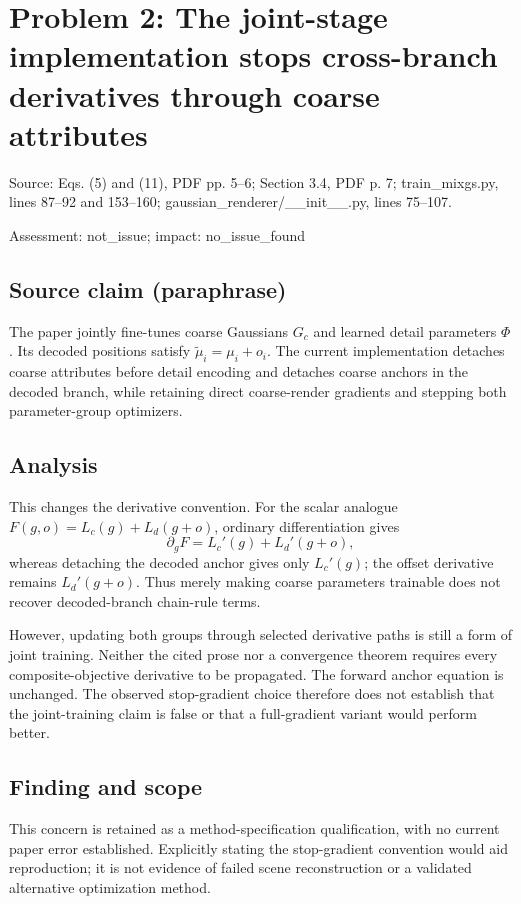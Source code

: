 \documentclass[11pt]{article}
\begin{document}
\section*{Problem 2: The joint-stage implementation stops cross-branch derivatives through coarse attributes}

Source: Eqs. (5) and (11), PDF pp. 5–6; Section 3.4, PDF p. 7; train\_mixgs.py, lines 87–92 and 153–160; gaussian\_renderer/\_\_init\_\_.py, lines 75–107.

Assessment: not\_issue; impact: no\_issue\_found

\subsection*{Source claim (paraphrase)}

The paper jointly fine-tunes coarse Gaussians \(G_c\) and learned detail parameters \(\Phi\). Its decoded positions satisfy \(\widetilde\mu_i=\mu_i+o_i\). The current implementation detaches coarse attributes before detail encoding and detaches coarse anchors in the decoded branch, while retaining direct coarse-render gradients and stepping both parameter-group optimizers.

\subsection*{Analysis}

This changes the derivative convention. For the scalar analogue \(F(g,o)=L_c(g)+L_d(g+o)\), ordinary differentiation gives \[\partial_gF=L_c\prime(g)+L_d\prime(g+o),\] whereas detaching the decoded anchor gives only \(L_c\prime(g)\); the offset derivative remains \(L_d\prime(g+o)\). Thus merely making coarse parameters trainable does not recover decoded-branch chain-rule terms.

However, updating both groups through selected derivative paths is still a form of joint training. Neither the cited prose nor a convergence theorem requires every composite-objective derivative to be propagated. The forward anchor equation is unchanged. The observed stop-gradient choice therefore does not establish that the joint-training claim is false or that a full-gradient variant would perform better.

\subsection*{Finding and scope}

This concern is retained as a method-specification qualification, with no current paper error established. Explicitly stating the stop-gradient convention would aid reproduction; it is not evidence of failed scene reconstruction or a validated alternative optimization method.
\end{document}
